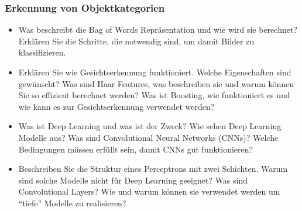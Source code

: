 \documentclass[paper=A4,11pt]{scrartcl}
\begin{document}
\subsubsection*{Erkennung von Objektkategorien} %

\begin{itemize}
    \item Was beschreibt die Bag of Words Repräsentation und wie wird sie berechnet? Erklären Sie die Schritte, die notwendig sind, um damit Bilder zu klassifizieren.
    \item Erklären Sie wie Gesichtserkennung funktioniert. Welche Eigenschaften sind gewünscht? Was sind Haar Features, was beschreiben sie und warum können Sie so effizient berechnet werden? Was ist Boosting, wie funktioniert es und wie kann es zur Gesichtserkennung verwendet werden?
    \item Was ist Deep Learning und was ist der Zweck? Wie sehen Deep Learning Modelle aus? Was sind Convolutional Neural Networks (CNNs)? Welche Bedingungen müssen erfüllt sein, damit CNNs gut funktionieren?
    \item Beschreiben Sie die Struktur eines Perceptrons mit zwei Schichten. Warum sind solche Modelle nicht für Deep Learning geeignet? Was sind Convolutional Layers? Wie und warum können sie verwendet werden um \enquote{tiefe} Modelle zu realisieren?
\end{itemize}
\end{document}

